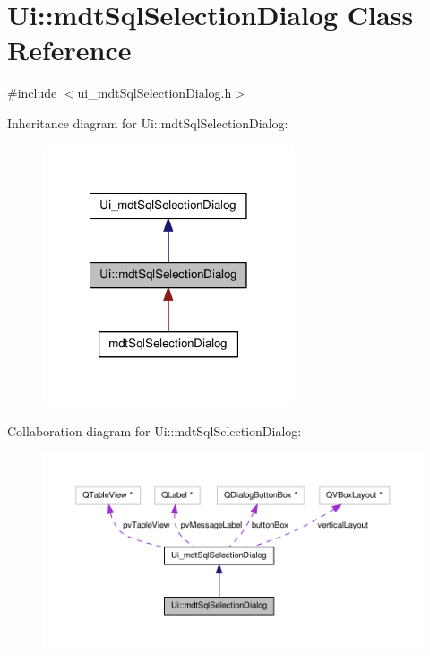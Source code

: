 \hypertarget{class_ui_1_1mdt_sql_selection_dialog}{\section{Ui\-:\-:mdt\-Sql\-Selection\-Dialog Class Reference}
\label{class_ui_1_1mdt_sql_selection_dialog}
}


{\ttfamily \#include $<$ui\-\_\-mdt\-Sql\-Selection\-Dialog.\-h$>$}



Inheritance diagram for Ui\-:\-:mdt\-Sql\-Selection\-Dialog\-:
\nopagebreak
\begin{figure}[H]
\begin{center}
\leavevmode
\includegraphics[width=210pt]{class_ui_1_1mdt_sql_selection_dialog__inherit__graph}
\end{center}
\end{figure}


Collaboration diagram for Ui\-:\-:mdt\-Sql\-Selection\-Dialog\-:
\nopagebreak
\begin{figure}[H]
\begin{center}
\leavevmode
\includegraphics[width=350pt]{class_ui_1_1mdt_sql_selection_dialog__coll__graph}
\end{center}
\end{figure}
